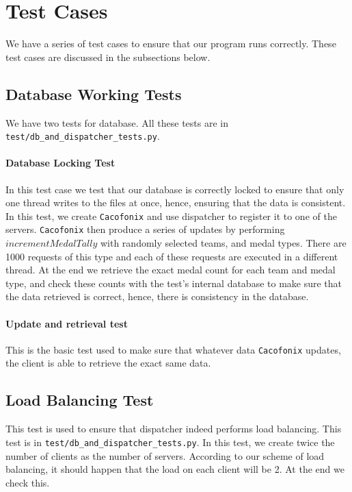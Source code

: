 \documentclass{article}
\begin{document}
\section{Test Cases}
We have a series of test cases to ensure that our program runs correctly.
These test cases are discussed in the subsections below.
\subsection{Database Working Tests}
We have two tests for database. All these tests are in \texttt{test/db\_and\_dispatcher\_tests.py}.
\paragraph{Database Locking Test} In this test case we test that our
database is correctly locked to ensure that only one thread writes to the
files at once, hence, ensuring that the data is consistent. In this test,
we create \texttt{Cacofonix} and use dispatcher to register it to one of 
the servers. \texttt{Cacofonix} then produce a series of updates by performing
 $incrementMedalTally$ with randomly selected
teams, and medal types. There are 1000 requests of this type and
each of these requests are executed in a different thread. At the end
we retrieve the exact medal count for each team and medal type, and 
check these counts with the test's internal database to make sure that the
data retrieved is correct, hence, there is consistency in the database.

\paragraph{Update and retrieval test} 
This is the basic test used to make sure that whatever data \texttt{Cacofonix}
updates, the client is able to retrieve the exact same data. 

\subsection{Load Balancing Test}
This test is used to ensure that dispatcher indeed performs load balancing.
This test is in \texttt{test/db\_and\_dispatcher\_tests.py}. In this test,
we create twice the number of clients as the number of servers. According 
to our scheme of load balancing, it should happen that the load on each client
will be 2. At the end we check this. 
\end{document}
